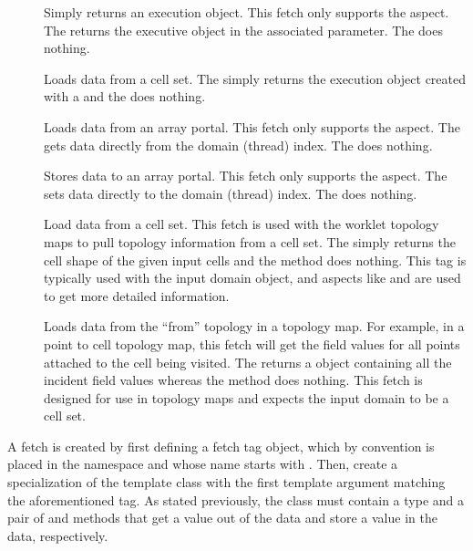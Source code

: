 \begin{description}
\item[] 
  Simply returns an execution object. This fetch only supports the
   aspect. The  returns the
  executive object in the associated parameter. The  does
  nothing.
\item[] 
  Loads data from a cell set.
  The  simply returns the execution object created with a  and the  does nothing.
\item[] 
  Loads data from an array portal. This fetch only supports the
   aspect. The  gets data
  directly from the domain (thread) index. The  does
  nothing.
\item[] 
  Stores data to an array portal. This fetch only supports the
   aspect. The  sets data
  directly to the domain (thread) index. The  does nothing.
\item[] 
  Load data from a cell set.
  This fetch is used with the worklet topology maps to pull topology information from a cell set.
  The  simply returns the cell shape of the given input cells and the  method does nothing.
  This tag is typically used with the input domain object, and aspects like  and  are used to get more detailed information.
\item[] 
  Loads data from the ``from'' topology in a topology map.
  For example, in a point to cell topology map, this fetch will get the field values for all points attached to the cell being visited.
  The  returns a \Veclike object containing all the incident field values whereas the  method does nothing.
  This fetch is designed for use in topology maps and expects the input domain to be a cell set.
\end{description}

A fetch is created by first defining a fetch tag object, which by convention is placed in the \vtkmexecarg{} namespace and whose name starts with .
Then, create a specialization of the  template class with the first template argument matching the aforementioned tag.
As stated previously, the  class must contain a  type and a pair of  and  methods that get a value out of the data and store a value in the data, respectively.

